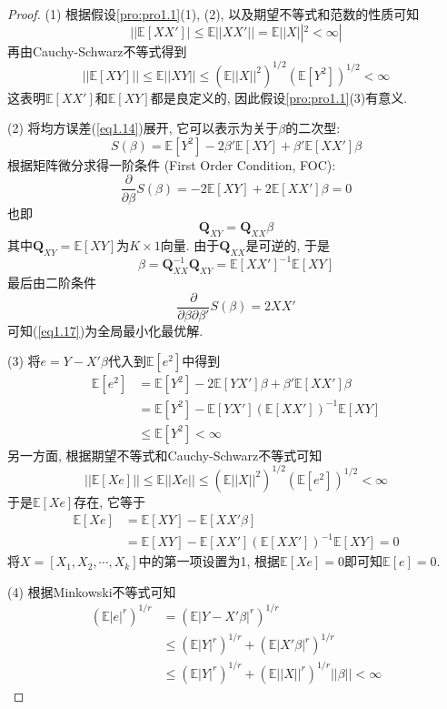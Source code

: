 \documentclass[cn, 12pt, math=mtpro2, bibstyle=apa, blue, twocol]{elegantbook}
\newcommand{\E}{\mathbb{E}}
\newcommand{\Q}{\mathbold{Q}}
\begin{document}
\begin{proof}
  (1) 根据假设\ref{pro:pro1.1}(1), (2), 以及期望不等式和范数的性质可知
  $$||\E[XX']|\leq\E||XX'||=\E||X||^2<\infty|$$
  再由Cauchy-Schwarz不等式得到
  $$||\E[XY]||\leq\E||XY||\leq(\E||X||^2)^{1/2}(\E[Y^2])^{1/2}<\infty$$
  这表明$\E[XX']$和$\E[XY]$都是良定义的, 因此假设\ref{pro:pro1.1}(3)有意义.

  (2) 将均方误差(\ref{eq1.14})展开, 它可以表示为关于$\beta$的二次型:
  $$S(\beta)=\E[Y^2]-2\beta'\E[XY]+\beta'\E[XX']\beta$$
  根据矩阵微分求得一阶条件 (First Order Condition, FOC):
  $$\frac{\partial}{\partial\beta}S(\beta)=-2\E[XY]+2\E[XX']\beta=0$$
  也即
  \begin{equation}\label{eq1.16}
    \Q_{XY}=\Q_{XX}\beta
  \end{equation}
  其中$\Q_{XY}=\E[XY]$为$K\times1$向量. 由于$\Q_{XX}$是可逆的, 于是
  \begin{equation}\label{eq1.17}
    \beta=\Q_{XX}^{-1}\Q_{XY}=\E[XX']^{-1}\E[XY]
  \end{equation}
  最后由二阶条件
  $$\frac{\partial}{\partial\beta\partial\beta'}S(\beta)=2XX'$$
  可知(\ref{eq1.17})为全局最小化最优解.

  (3) 将$e=Y-X'\beta$代入到$\E[e^2]$中得到
  \begin{align*}
  \E[e^2]&=\E[Y^2]-2\E[YX']\beta+\beta'\E[XX']\beta \\
  &=\E[Y^2]-\E[YX'](\E[XX'])^{-1}\E[XY]\\
  &\leq\E[Y^2]<\infty
  \end{align*}
  另一方面, 根据期望不等式和Cauchy-Schwarz不等式可知
  $$||\E[Xe]||\leq\E||Xe||\leq(\E||X||^2)^{1/2}(\E[e^2])^{1/2}<\infty$$
  于是$\E[Xe]$存在, 它等于
  \begin{align*}
  \E[Xe]&=\E[XY]-\E[XX'\beta] \\
  &=\E[XY]-\E[XX'](\E[XX'])^{-1}\E[XY]=0
  \end{align*}
  将$X=[X_1,X_2,\cdots,X_k]$中的第一项设置为1, 根据$\E[Xe]=0$即可知$\E[e]=0$.

  (4) 根据Minkowski不等式可知
  \begin{align*}
  (\E|e|^r)^{1/r}&=(\E|Y-X'\beta|^r)^{1/r}\\
  &\leq(\E|Y|^r)^{1/r}+(\E|X'\beta|^r)^{1/r}\\
  &\leq(\E|Y|^r)^{1/r}+(\E||X||^r)^{1/r}||\beta||<\infty
  \end{align*}

\end{proof}
\end{document}
